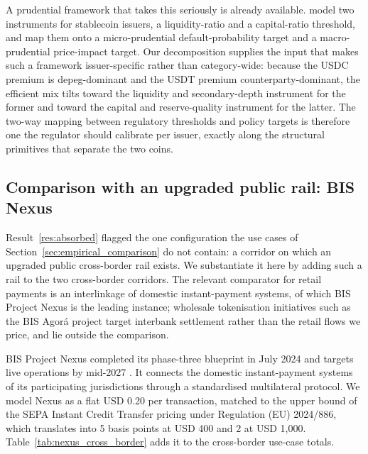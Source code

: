 A prudential framework that takes this seriously is already available. \citet{goel_lewrick_agarwal_2026} model two instruments for stablecoin issuers, a liquidity-ratio and a capital-ratio threshold, and map them onto a micro-prudential default-probability target and a macro-prudential price-impact target. Our decomposition supplies the input that makes such a framework issuer-specific rather than category-wide: because the USDC premium is depeg-dominant and the USDT premium counterparty-dominant, the efficient mix tilts toward the liquidity and secondary-depth instrument for the former and toward the capital and reserve-quality instrument for the latter. The two-way mapping between regulatory thresholds and policy targets is therefore one the regulator should calibrate per issuer, exactly along the structural primitives that separate the two coins.

\subsection{Comparison with an upgraded public rail: BIS Nexus}\label{sub:public_trajectory}

Result~\ref{res:absorbed} flagged the one configuration the use cases of Section~\ref{sec:empirical_comparison} do not contain: a corridor on which an upgraded public cross-border rail exists. We substantiate it here by adding such a rail to the two cross-border corridors. The relevant comparator for retail payments is an interlinkage of domestic instant-payment systems, of which BIS Project Nexus is the leading instance; wholesale tokenisation initiatives such as the BIS Agor\'a project target interbank settlement rather than the retail flows we price, and lie outside the comparison.

BIS Project Nexus completed its phase-three blueprint in July 2024 and targets live operations by mid-2027 \citep{bis_nexus_2024}. It connects the domestic instant-payment systems of its participating jurisdictions through a standardised multilateral protocol. We model Nexus as a flat USD 0.20 per transaction, matched to the upper bound of the SEPA Instant Credit Transfer pricing under Regulation (EU) 2024/886, which translates into 5 basis points at USD 400 and 2 at USD 1{,}000. Table~\ref{tab:nexus_cross_border} adds it to the cross-border use-case totals.

